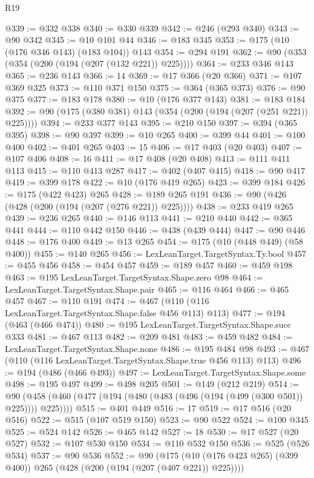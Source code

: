 \begin{lexlean}{R19}
\begin{coremodule}
@339 := @332 @338
@340 := @330 @339
@342 := @246 (@293 @340)
@343 := @90 @342
@345 := @10 @101 @44
@346 := @183 @345
@353 := @175 (@10 (@176 @346 @143) (@183 @104)) @143
@354 := @294 @191
@362 := @90 (@353 (@354 (@200 (@194 (@207 (@132 @221)) @225))))
@364 := @233 @346 @143
@365 := @236 @143
@366 := 14
@369 := @17 @366 (@20 @366)
@371 := @107 @369 @325
@373 := @110 @371 @150
@375 := @364 (@365 @373)
@376 := @90 @375
@377 := @183 @178
@380 := @10 (@176 @377 @143)
@381 := @183 @184
@392 := @90 (@175 (@380 @381) @143 (@354 (@200 (@194 (@207 (@251 @221)) @225))))
@394 := @233 @377 @143
@395 := @210 @150
@397 := @394 (@365 @395)
@398 := @90 @397
@399 := @10 @265
@400 := @399 @44
@401 := @100 @400
@402 := @401 @265
@403 := 15
@406 := @17 @403 (@20 @403)
@407 := @107 @406
@408 := 16
@411 := @17 @408 (@20 @408)
@413 := @111 @411 @113
@415 := @110 @413 @287
@417 := @402 (@407 @415)
@418 := @90 @417
@419 := @399 @178
@422 := @10 (@176 @419 @265)
@423 := @399 @184
@426 := @175 (@422 @423) @265
@428 := @189 @265 @191
@436 := @90 (@426 (@428 (@200 (@194 (@207 (@276 @221)) @225))))
@438 := @233 @419 @265
@439 := @236 @265
@440 := @146 @113
@441 := @210 @440
@442 := @365 @441
@444 := @110 @442 @150
@446 := @438 (@439 @444)
@447 := @90 @446
@448 := @176 @400
@449 := @13 @265
@454 := @175 (@10 (@448 @449) (@58 @400))
@455 := @140 @265
@456 := LexLeanTarget.TargetSyntax.Ty.bool
@457 := @455 @456
@458 := @454 @457
@459 := @189 @457
@460 := @459 @198
@463 := @195 LexLeanTarget.TargetSyntax.Shape.zero @98
@464 := LexLeanTarget.TargetSyntax.Shape.pair
@465 := @116 @464
@466 := @465 @457
@467 := @110 @191
@474 := @467 (@110 (@116 LexLeanTarget.TargetSyntax.Shape.false @456 @113) @113)
@477 := @194 (@463 (@466 @474))
@480 := @195 LexLeanTarget.TargetSyntax.Shape.succ @333
@481 := @467 @113
@482 := @209 @481
@483 := @459 @482
@484 := LexLeanTarget.TargetSyntax.Shape.none
@486 := @195 @484 @98
@493 := @467 (@110 (@116 LexLeanTarget.TargetSyntax.Shape.true @456 @113) @113)
@496 := @194 (@486 (@466 @493))
@497 := LexLeanTarget.TargetSyntax.Shape.some
@498 := @195 @497
@499 := @498 @205
@501 := @149 (@212 @219)
@514 := @90 (@458 (@460 (@477 (@194 (@480 (@483 (@496 (@194 (@499 (@300 @501)) @225)))) @225))))
@515 := @401 @449
@516 := 17
@519 := @17 @516 (@20 @516)
@522 := @515 (@107 @519 @150)
@523 := @90 @522
@524 := @100 @345
@525 := @524 @142
@526 := @465 @142
@527 := 18
@530 := @17 @527 (@20 @527)
@532 := @107 @530 @150
@534 := @110 @532 @150
@536 := @525 (@526 @534)
@537 := @90 @536
@552 := @90
    (@175 (@10 (@176 @423 @265) (@399 @400)) @265 (@428 (@200 (@194 (@207 (@407 @221)) @225))))

\end{coremodule}
\end{lexlean}
